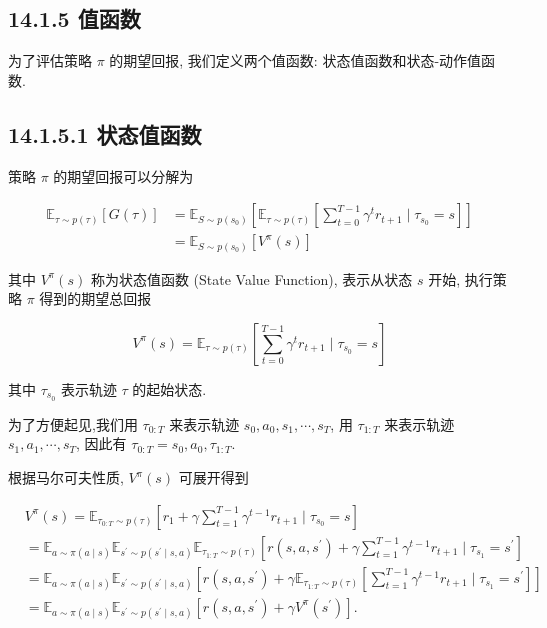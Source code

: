 \documentclass[10pt]{article}
\begin{document}
\subsection*{14.1.5 值函数}
为了评估策略 $\pi$ 的期望回报, 我们定义两个值函数: 状态值函数和状态-动作值函数.

\subsection*{14.1.5.1 状态值函数}
策略 $\pi$ 的期望回报可以分解为


\begin{align*}
\mathbb{E}_{\tau \sim p(\tau)}[G(\tau)] & =\mathbb{E}_{S \sim p\left(s_{0}\right)}\left[\mathbb{E}_{\tau \sim p(\tau)}\left[\sum_{t=0}^{T-1} \gamma^{t} r_{t+1} \mid \tau_{s_{0}}=s\right]\right]  \tag{14.12}\\
& =\mathbb{E}_{S \sim p\left(s_{0}\right)}\left[V^{\pi}(s)\right] \tag{14.13}
\end{align*}


其中 $V^{\pi}(s)$ 称为状态值函数 (State Value Function), 表示从状态 $s$ 开始, 执行策略 $\pi$ 得到的期望总回报


\begin{equation*}
V^{\pi}(s)=\mathbb{E}_{\tau \sim p(\tau)}\left[\sum_{t=0}^{T-1} \gamma^{t} r_{t+1} \mid \tau_{s_{0}}=s\right] \tag{14.14}
\end{equation*}


其中 $\tau_{s_{0}}$ 表示轨迹 $\tau$ 的起始状态.

为了方便起见,我们用 $\tau_{0: T}$ 来表示轨迹 $s_{0}, a_{0}, s_{1}, \cdots, s_{T}$, 用 $\tau_{1: T}$ 来表示轨迹 $s_{1}, a_{1}, \cdots, s_{T}$, 因此有 $\tau_{0: T}=s_{0}, a_{0}, \tau_{1: T}$.

根据马尔可夫性质, $V^{\pi}(s)$ 可展开得到


\begin{align*}
& V^{\pi}(s)=\mathbb{E}_{\tau_{0: T} \sim p(\tau)}\left[r_{1}+\gamma \sum_{t=1}^{T-1} \gamma^{t-1} r_{t+1} \mid \tau_{s_{0}}=s\right]  \tag{14.15}\\
& =\mathbb{E}_{a \sim \pi(a \mid s)} \mathbb{E}_{s^{\prime} \sim p\left(s^{\prime} \mid s, a\right)} \mathbb{E}_{\tau_{1: T} \sim p(\tau)}\left[r\left(s, a, s^{\prime}\right)+\gamma \sum_{t=1}^{T-1} \gamma^{t-1} r_{t+1} \mid \tau_{s_{1}}=s^{\prime}\right]  \tag{14.16}\\
& =\mathbb{E}_{a \sim \pi(a \mid s)} \mathbb{E}_{s^{\prime} \sim p\left(s^{\prime} \mid s, a\right)}\left[r\left(s, a, s^{\prime}\right)+\gamma \mathbb{E}_{\tau_{1: T} \sim p(\tau)}\left[\sum_{t=1}^{T-1} \gamma^{t-1} r_{t+1} \mid \tau_{s_{1}}=s^{\prime}\right]\right]  \tag{14.17}\\
& =\mathbb{E}_{a \sim \pi(a \mid s)} \mathbb{E}_{s^{\prime} \sim p\left(s^{\prime} \mid s, a\right)}\left[r\left(s, a, s^{\prime}\right)+\gamma V^{\pi}\left(s^{\prime}\right)\right] . \tag{14.18}
\end{align*}
\end{document}
